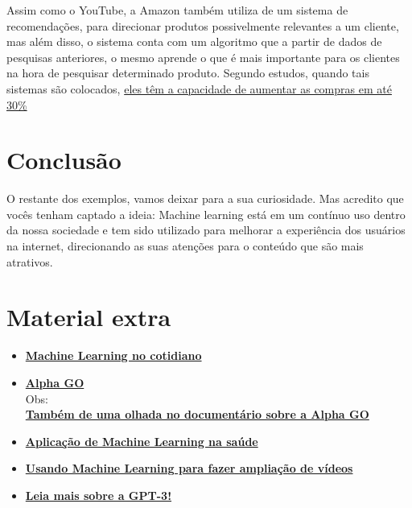 \documentclass{article}
\begin{document}
    Assim como o YouTube, a Amazon também utiliza de um sistema de recomendações, 
    para direcionar produtos possivelmente relevantes a um cliente, mas além 
    disso, o sistema conta com um algoritmo que a partir de dados de pesquisas
    anteriores, o mesmo aprende o que é mais importante para os clientes na 
    hora de pesquisar determinado produto. Segundo estudos, quando tais 
    sistemas são colocados, \href{https://papers.ssrn.com/sol3/papers.cfm?abstract_id=2263983}
    {eles têm a capacidade de aumentar as compras em até 30\%}


    \newpage
    \section{Conclusão}
    O restante dos exemplos, vamos deixar para a sua curiosidade. Mas acredito que 
    vocês tenham captado a ideia: Machine learning está em um contínuo uso dentro da 
    nossa sociedade e tem sido utilizado para melhorar a experiência dos usuários na internet, 
    direcionando as suas atenções para o conteúdo que são mais atrativos.


    \newpage
    \section*{\centering Material extra}\label{sec:extra} %

    \begin{itemize}
        \item \href{http://datascienceacademy.com.br/blog/17-casos-de-uso-de-machine-learning/}{\textbf{Machine Learning no cotidiano}}
        \item \href{https://deepmind.com/research/case-studies/alphago-the-story-so-far}{\textbf{Alpha GO}} \\ Obs: \\ \href{https://youtu.be/WXuK6gekU1Y}{\textbf{Também de uma olhada no documentário sobre a Alpha GO}}
        \item \href{https://youtu.be/uGYJuOyIvzs}{\textbf{Aplicação de Machine Learning na saúde}}
        \item \href{https://youtu.be/AwmvwTopbas}{\textbf{Usando Machine Learning para fazer ampliação de vídeos}}
        \item \href{https://forbes.com.br/forbes-insider/2020/07/por-que-o-programa-de-inteligencia-artificial-gpt-3-e-incrivel-mas-superestimado/}{\textbf{Leia mais sobre a GPT-3!}}
    \end{itemize}
\end{document}
